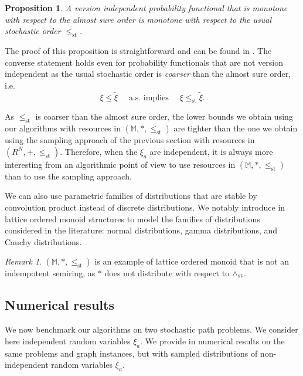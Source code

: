 \documentclass[11pt]{amsart}
\theoremstyle{plain}
\newtheorem{prop}[theo]{Proposition}
\theoremstyle{remark}
\newtheorem{rem}{Remark}
\def\bbM{\mathbb{M}}
\newcommand{\leqst}{\leq_{\mathrm{st}}} \newcommand{\nleqst}{\nleq_{st}}
\begin{document}
\begin{prop}\label{prop:MonotonicityLeqSt}
A version independent probability functional that is monotone with respect to the almost sure order is monotone with respect to the usual stochastic order $\leqst$.
\end{prop}
The proof of this proposition is straightforward and can be found in \cite{parmentier2016thesis}. The converse statement holds even for probability functionals that are not version independent as the usual stochastic order is \emph{coarser} than the almost sure order, i.e.
$$\xi \leq \tilde{\xi} \quad \text{ a.s.\ implies } \quad\xi \leqst \tilde{\xi}.$$

As $\leqst$ is coarser than the almost sure order, the lower bounds we obtain using our algorithms with resources in $(\bbM,\ast,\leqst)$ are tighter than the one we obtain using the sampling approach of the previous section with resources in $(R^{N},+,\leqst)$. Therefore, when the $\xi_{a}$ are independent, it is always more interesting from an algorithmic point of view to use resources in $(\bbM,\ast,\leqst)$ than to use the sampling approach.

We can also use parametric families of distributions that are stable by convolution product instead of discrete distributions. We notably introduce in \cite{parmentier2016thesis} lattice ordered monoid structures to model the families of distributions considered in the literature: normal distributions, gamma distributions, and Cauchy distributions.

\begin{rem}
$(\bbM,\ast,\leqst)$ is an example of lattice ordered monoid that is not an indempotent semiring, as $\ast$ does not distribute with respect to $\wedge_{\mathrm{st}}$.
\end{rem}


\subsection{Numerical results} 

We now benchmark our algorithms on two stochastic path problems. We consider here independent random variables $\xi_{a}$. We provide in \cite{parmentier2016thesis} numerical results on the same problems and graph instances, but with sampled distributions of non-independent random variables $\xi_{a}$.
\end{document}
